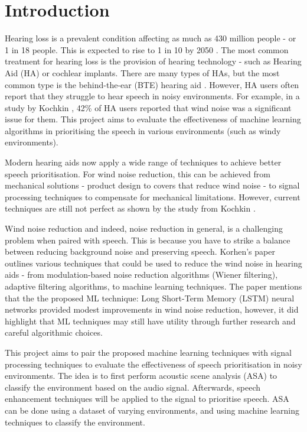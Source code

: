 \documentclass[logo,bsc,singlespacing,parskip,online]{infthesis}
\begin{document}
\chapter{Introduction}
Hearing loss is a prevalent condition affecting as much as 
430 million people - or 1 in 18 people. This is expected 
to rise to 1 in 10 by 2050 \cite{DeafnessHearingLoss}.
The most common treatment for hearing loss is the 
provision of hearing technology - such as Hearing Aid (HA) or cochlear implants.
There are many types of HAs, but the most common
type is the behind-the-ear (BTE) hearing aid \cite{kochkinMarkeTrakVIIIConsumer2010}.
However, HA users often report that they struggle to hear speech
in noisy environments. For example, in a study by Kochkin \cite{kochkinMarkeTrakVIIIConsumer2010},
42\% of HA users reported that wind noise was a significant issue for them.
This project aims to evaluate the effectiveness of machine learning algorithms
in prioritising the speech in various environments (such as windy environments).

Modern hearing aids now apply a wide range of techniques to achieve 
better speech prioritisation. For wind noise reduction, this can be achieved 
from mechanical solutions - product design to covers that reduce wind noise - to 
signal processing techniques to compensate for mechanical limitations.
However, current techniques are still not perfect as shown by the study from Kochkin \cite{kochkinMarkeTrakVIIIConsumer2010}.

Wind noise reduction and indeed, noise reduction in general, is a challenging problem
when paired with speech. This is because you have 
to strike a balance between reducing background noise and
preserving speech. 
Korhen's paper \cite{korhonenWindNoiseManagement2021} outlines 
various techniques that could be used to reduce the wind noise in hearing aids -
from modulation-based noise reduction algorithms (Wiener filtering),
adaptive filtering algorithms, to machine learning techniques.
The paper mentions that the the proposed ML technique:
Long Short-Term Memory (LSTM) neural networks provided
modest improvements in wind noise reduction, however, it did highlight
that ML techniques may still have utility through further research 
and careful algorithmic choices. 

This project aims to pair the proposed machine learning techniques with
signal processing techniques to evaluate the effectiveness of 
speech prioritisation in noisy environments. The idea is to first 
perform acoustic scene analysis (ASA) to classify the environment
based on the audio signal. Afterwards, speech enhancement 
techniques will be applied to the signal to prioritise speech.
ASA can be done using a dataset of varying environments, and 
using machine learning techniques to classify the environment.
\end{document}
